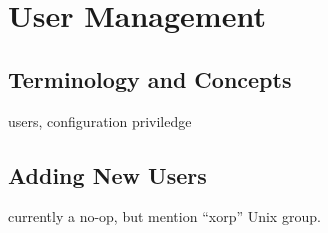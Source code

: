 %
%

\chapter{User Management}

\section{Terminology and Concepts}

users, configuration priviledge

\section{Adding New Users}

currently a no-op, but mention ``xorp'' Unix group.




